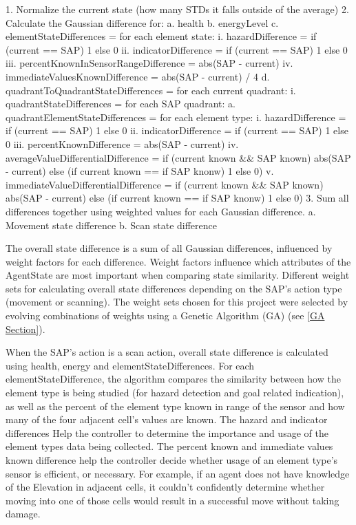 \begin{listings}
1. Normalize the current state (how many STDs it falls outside of the average)
2. Calculate the Gaussian difference for:
  a. health
  b. energyLevel
  c. elementStateDifferences = for each element state:
    i. hazardDifference = if (current == SAP) 1 else 0
    ii. indicatorDifference = if (current == SAP) 1 else 0
    iii. percentKnownInSensorRangeDifference = abs(SAP - current)
    iv. immediateValuesKnownDifference = abs(SAP - current) / 4
  d. quadrantToQuadrantStateDifferences = for each current quadrant:
    i. quadrantStateDifferences = for each SAP quadrant:
      a. quadrantElementStateDifferences = for each element type:
        i. hazardDifference = if (current == SAP) 1 else 0
        ii. indicatorDifference = if (current == SAP) 1 else 0
        iii. percentKnownDifference = abs(SAP - current)
        iv. averageValueDifferentialDifference = if (current known && SAP known) abs(SAP - current) else (if current known == if SAP knonw) 1 else 0)
        v. immediateValueDifferentialDifference = if (current known && SAP known) abs(SAP - current) else (if current known == if SAP knonw) 1 else 0)
3. Sum all differences together using weighted values for each Gaussian difference.
  a. Movement state difference
  b. Scan state difference
\end{listings}

The overall state difference is a sum of all Gaussian differences, influenced by weight factors for each difference.
Weight factors influence which attributes of the AgentState are most important when comparing state similarity.
Different weight sets for calculating overall state differences depending on the SAP's action type (movement or scanning).
The weight sets chosen for this project were selected by evolving combinations of weights using a Genetic Algorithm (GA) (see \ref{GA Section}).

When the SAP's action is a scan action, overall state difference is calculated using health, energy and elementStateDifferences.
For each elementStateDifference, the algorithm compares the similarity between how the element type is being studied (for hazard detection and goal related indication), as well as the percent of the element type known in range of the sensor and how many of the four adjacent cell's values are known.
The hazard and indicator differences Help the controller to determine the importance and usage of the element types data being collected.
The percent known and immediate values known difference help the controller decide whether usage of an element type's sensor is efficient, or necessary.
For example, if an agent does not have knowledge of the Elevation in adjacent cells, it couldn't confidently determine whether moving into one of those cells would result in a successful move without taking damage.

